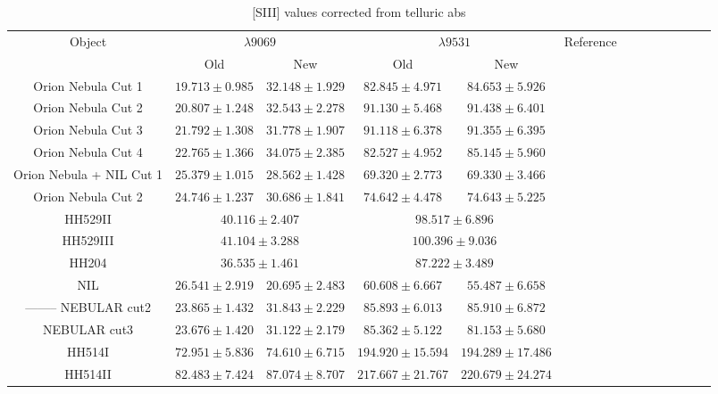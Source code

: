 \documentclass[fleqn,usenatbib]{mnras}
\begin{document}
\begin{table}
\centering
\caption{[SIII] values corrected from telluric abs}
\label{tab:tellabs}
\begin{tabular}{ccccccccccccc}
\hline
Object &   \multicolumn{2}{c}{$\lambda 9069$} & \multicolumn{2}{c}{$\lambda 9531$} & Reference\\
 & Old & New  & Old & New & \\
\hline

Orion Nebula Cut 1 & $19.713 \pm 0.985$ & $32.148\pm 1.929$& $82.845 \pm 4.971$ & $84.653 \pm 5.926$ & \multirow{4}{*}{\citet{mendez2021}}\\

Orion Nebula Cut 2 & $20.807 \pm 1.248$ &  $32.543 \pm 2.278$& $91.130\pm 5.468$&$91.438 \pm 6.401 $\\

Orion Nebula Cut 3 & $21.792\pm 1.308$ & $31.778\pm 1.907$& $91.118\pm 6.378$&$91.355 \pm 6.395$\\

Orion Nebula Cut 4 &$22.765 \pm 1.366$ & $ 34.075 \pm 2.385$ & $82.527\pm 4.952$ & $85.145\pm5.960$\\


Orion Nebula + NIL Cut 1 & $25.379\pm 1.015$ & $28.562\pm 1.428$ & $ 69.320 \pm 2.773$ & $69.330 \pm 3.466$ & \multirow{2}{*}{\citet{mendez2021-2}}\\

Orion Nebula Cut 2 & $24.746\pm 1.237$ & $30.686\pm 1.841$ & $74.642\pm 4.478$ & $74.643\pm 5.225$ \\

HH529II & \multicolumn{2}{c}{$40.116 \pm 2.407$} &  \multicolumn{2}{c}{$98.517 \pm 6.896$}&\multirow{2}{*}{\citet{mendez2021}}\\

HH529III & \multicolumn{2}{c}{$41.104 \pm 3.288$} &  \multicolumn{2}{c}{$100.396 \pm 9.036$}&\\

HH204 & \multicolumn{2}{c}{$36.535 \pm 1.461$} & \multicolumn{2}{c}{$87.222\pm 3.489$}\\

NIL & $26.541\pm 2.919$ & $20.695\pm2.483$& $ 60.608\pm 6.667$& $55.487\pm 6.658$& \citet{mendez2021-2}\\

--------
NEBULAR cut2 &$23.865\pm 1.432$& $31.843\pm2.229$ & $85.893\pm 6.013$ & $85.910 \pm  6.872$ \\ 

NEBULAR cut3 &$23.676\pm 1.420$ & $31.122\pm 2.179$ & $85.362\pm 5.122$ & $81.153\pm 5.680$\\ 


HH514I & $72.951\pm 5.836$ &$74.610\pm6.715$ & $194.920\pm 15.594$&$194.289 \pm 17.486$\\ 

HH514II & $82.483\pm 7.424$ &$87.074\pm 8.707$&$217.667\pm21.767$&$ 220.679\pm24.274 $\\ 


\hline
\end{tabular}
\end{table}
\end{document}
